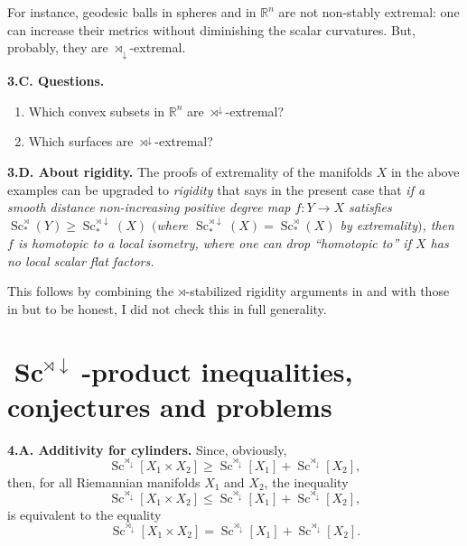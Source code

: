 \documentclass[10pt,a4paper]{amsart}
\numberwithin{equation}{section}
\begin{document}
 For instance,
 geodesic balls in spheres and in $\mathbb R^n$ are not non-stably extremal:
 one can increase their metrics without diminishing the scalar curvatures. But,
probably, they are
 $\rtimes_\downarrow$-extremal.

 \textbf{3.C. Questions.}
 \begin{enumerate}\itemsep=0pt
 \item[(i)] Which convex subsets in $\mathbb R^n$ are $\rtimes^\downarrow$-extremal?
\item[(ii)] Which surfaces are $\rtimes^\downarrow$-extremal?
\end{enumerate}

\textbf{3.D. About rigidity.}
 The proofs of extremality of the manifolds $X$ in the above examples can be upgraded to {\it rigidity} that says in the present case that
 {\it if a smooth distance non-increasing positive degree map $f\colon Y\to X$ satisfies
 $\operatorname{Sc}_\ast^\rtimes(Y)\geq \operatorname{Sc}_\ast^{\rtimes\downarrow}(X)$ $($where $ \operatorname{Sc}_\ast^{\rtimes\downarrow}(X)=\operatorname{Sc}_\ast^\rtimes(X)$ by extremality$)$, then $f$ is homotopic to a local isometry, where one
 can drop ``homotopic to''
 if $X$ has no local scalar flat factors.}

This follows by combining the $\rtimes$-stabilized rigidity arguments in \cite{GS2002} and \cite{Li2010} with those in \cite[\S5.7]{Gr2021}
but to be honest, I did not check this in full generality.

 \section[Sc\^{}\{rtimes downarrow\}-product inequalities, conjectures and problems]{$\boldsymbol{\operatorname{Sc}^{\rtimes\downarrow}}$-product inequalities, conjectures and problems}\label{section4}

 \textbf{4.A. Additivity for cylinders.} Since, obviously,
\[
\operatorname{Sc}^{\rtimes_\downarrow}[X_1\times X_2]\geq \operatorname{Sc}^{\rtimes_\downarrow}[X_1]+\operatorname{Sc}^{\rtimes_\downarrow}[X_2],
\]
then, for all Riemannian manifolds $X_1$ and $X_2$, the inequality
\[
\operatorname{Sc}^{\rtimes_\downarrow}[X_1\times X_2]\leq \operatorname{Sc}^{\rtimes_\downarrow}[X_1]+\operatorname{Sc}^{\rtimes_\downarrow}[X_2],
\]
 is equivalent to the equality
\[
\operatorname{Sc}^{\rtimes_\downarrow}[X_1\times X_2]= \operatorname{Sc}^{\rtimes_\downarrow}[X_1]+\operatorname{Sc}^{\rtimes_\downarrow}[X_2].
\]
\end{document}
